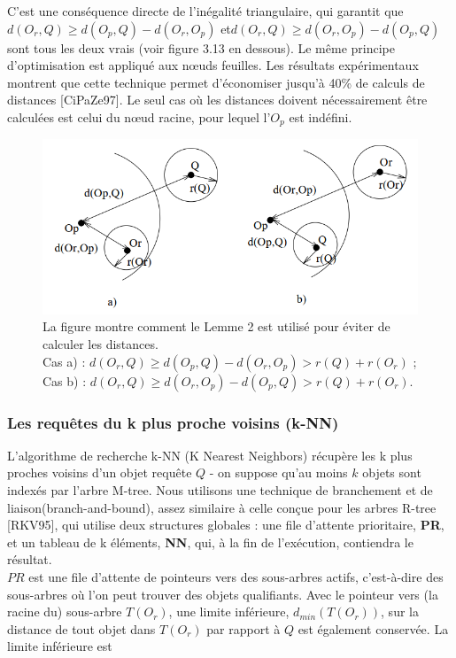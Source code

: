 C'est une conséquence directe de l'inégalité triangulaire, qui garantit que $ d(O_r, Q) \ge d(O_p, Q)-d(O_r, O_p) $ et$  d(O_r, Q) \ge d(O_r, O_p)-d(O_p, Q) $ sont tous les deux vrais (voir figure 3.13 en dessous). Le même principe d'optimisation est appliqué aux nœuds feuilles. Les résultats expérimentaux montrent que cette technique permet d'économiser jusqu'à 40\% de calculs de distances [CiPaZe97]. Le seul cas où les distances doivent nécessairement être calculées est celui du nœud racine, pour lequel l'$ O_p $ est indéfini.

\begin{figure}[H]
	\centering
	\includegraphics[width=.6 \textwidth]{Figures/lemme.png} %
	\caption{La figure montre comment le Lemme 2 est utilisé pour éviter de calculer les distances. \\Cas a) : $ d(O_r, Q) \ge d(O_p, Q) - d(O_r, O_p) > r(Q) + r(O_r) $ ; \\
		Cas b) : $ d(O_r, Q) \ge d(O_r, O_p) - d(O_p, Q) > r(Q) + r(O_r) $.}
\end{figure} 

\subsubsection{Les requêtes du k plus proche voisins (k-NN)}

L'algorithme de recherche k-NN (K Nearest Neighbors) récupère les k plus proches voisins d'un objet requête $ Q $ - on suppose qu'au moins $ k $ objets sont indexés par l'arbre M-tree. Nous utilisons une technique de branchement et de liaison(branch-and-bound), assez similaire à celle conçue pour les arbres R-tree [RKV95], qui utilise deux structures globales : une file d'attente prioritaire, \textbf{PR}, et un tableau de k éléments, \textbf{NN}, qui, à la fin de l'exécution, contiendra le résultat.\\

$ PR $ est une file d'attente de pointeurs vers des sous-arbres actifs, c'est-à-dire des sous-arbres où l'on peut trouver des objets qualifiants. Avec le pointeur vers (la racine du) sous-arbre $ T (O_r) $, une limite inférieure, $ d_{min}(T (O_r)) $, sur la distance de tout objet dans $ T (O_r) $ par rapport à $ Q $ est également conservée. La limite inférieure est

